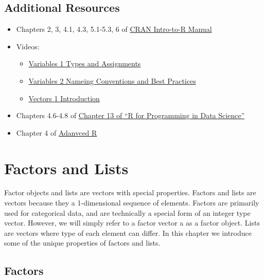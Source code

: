 \documentclass[
]{book}
\providecommand{\tightlist}{%
  \setlength{\itemsep}{0pt}\setlength{\parskip}{0pt}}
\begin{document}
\hypertarget{additional-resources-1}{%
\section*{Additional Resources}\label{additional-resources-1}}

\begin{itemize}
\tightlist
\item
  Chapters 2, 3, 4.1, 4.3, 5.1-5.3, 6 of \href{https://cran.r-project.org/doc/manuals/r-release/R-intro.pdf}{CRAN Intro-to-R Manual}
\item
  Videos:

  \begin{itemize}
  \tightlist
  \item
    \href{https://ucr.yuja.com/V/Video?v=2368642\&node=8487537\&a=1529691043\&autoplay=1}{Variables 1 \textbar{} Types and Assignments}
  \item
    \href{https://ucr.yuja.com/V/Video?v=2368641\&node=8487536\&a=957339369\&autoplay=1}{Variables 2 \textbar{} Nameing Conventions and Best Practices}
  \item
    \href{https://ucr.yuja.com/V/Video?v=2368859\&node=8488053\&a=283774152\&autoplay=1}{Vectors 1 \textbar{} Introduction}
  \end{itemize}
\item
  Chapters 4.6-4.8 of \href{https://bookdown.org/rdpeng/rprogdatascience/}{Chapter 13 of ``R for Programming in Data Science''}
\item
  Chapter 4 of \href{https://adv-r.hadley.nz/index.html}{Adanvced R}
\end{itemize}

\hypertarget{factors-and-lists}{%
\chapter{Factors and Lists}\label{factors-and-lists}}

Factor objects and lists are vectors with special properties. Factors and lists are vectors because they a 1-dimensional sequence of elements. Factors are primarily used for categorical data, and are technically a special form of an integer type vector. However, we will simply refer to a factor vector a as a factor object. Lists are vectors where type of each element can differ. In this chapter we introduce some of the unique properties of factors and lists.

\hypertarget{factors}{%
\section{Factors}\label{factors}}
\end{document}
